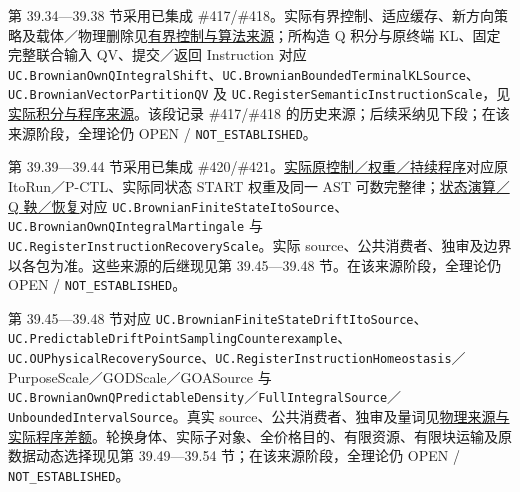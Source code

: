 \documentclass[
  11pt,
  oneside]{book}
\begin{document}
第 39.34---39.38 节采用已集成 \#417/\#418。实际有界控制、适应缓存、新方向策略及载体／物理删除见\href{../formalization/ueot-core/docs/compression/theory_completion/unified_closure/bounded_control_carrier_source_v1/RESULTS_AND_OPEN_OBLIGATIONS.md}{有界控制与算法来源}；所构造 Q 积分与原终端 KL、固定完整联合输入 QV、提交／返回 Instruction 对应 \nolinkurl{UC.BrownianOwnQIntegralShift}、\nolinkurl{UC.BrownianBoundedTerminalKLSource}、\nolinkurl{UC.BrownianVectorPartitionQV} 及 \nolinkurl{UC.RegisterSemanticInstructionScale}，见\href{../formalization/ueot-core/docs/compression/theory_completion/unified_closure/q_integral_vector_qv_program_source_v1/RESULTS_AND_OPEN_OBLIGATIONS.md}{实际积分与程序来源}。该段记录 \#417/\#418 的历史来源；后续采纳见下段；在该来源阶段，全理论仍 OPEN / \nolinkurl{NOT_ESTABLISHED}。

第 39.39---39.44 节采用已集成 \#420/\#421。\href{../formalization/ueot-core/docs/compression/theory_completion/unified_closure/fixed_q_run_stateweighted_source_v1/RESULTS_AND_OPEN_OBLIGATIONS.md}{实际原控制／权重／持续程序}对应原 ItoRun／P-CTL、实际同状态 START 权重及同一 AST 可数完整律；\href{../formalization/ueot-core/docs/compression/theory_completion/unified_closure/state_ito_q_martingale_recovery_source_v1/RESULTS_AND_OPEN_OBLIGATIONS.md}{状态演算／Q 鞅／恢复}对应 \nolinkurl{UC.BrownianFiniteStateItoSource}、\nolinkurl{UC.BrownianOwnQIntegralMartingale} 与 \nolinkurl{UC.RegisterInstructionRecoveryScale}。实际 source、公共消费者、独审及边界以各包为准。这些来源的后继现见第 39.45---39.48 节。在该来源阶段，全理论仍 OPEN / \nolinkurl{NOT_ESTABLISHED}。

第 39.45---39.48 节对应 \nolinkurl{UC.BrownianFiniteStateDriftItoSource}、\nolinkurl{UC.PredictableDriftPointSamplingCounterexample}、\nolinkurl{UC.OUPhysicalRecoverySource}、\nolinkurl{UC.RegisterInstructionHomeostasis}／PurposeScale／GODScale／GOASource 与 \nolinkurl{UC.BrownianOwnQPredictableDensity}／\nolinkurl{FullIntegralSource}／\nolinkurl{UnboundedIntervalSource}。真实 source、公共消费者、独审及量词见\href{../formalization/ueot-core/docs/compression/theory_completion/unified_closure/drift_ou_instruction_qfull_source_v1/RESULTS_AND_OPEN_OBLIGATIONS.md}{物理来源与实际程序差额}。轮换身体、实际子对象、全价格目的、有限资源、有限块运输及原数据动态选择现见第 39.49---39.54 节；在该来源阶段，全理论仍 OPEN / \nolinkurl{NOT_ESTABLISHED}。
\end{document}
